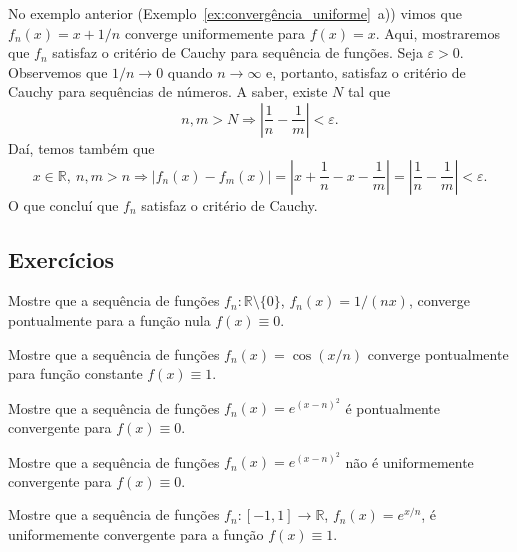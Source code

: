 \begin{ex}
  No exemplo anterior (Exemplo~\ref{ex:convergência_uniforme}~a)) vimos que $f_n(x) = x + 1/n$ converge uniformemente para $f(x) = x$. Aqui, mostraremos que $f_n$ satisfaz o critério de Cauchy para sequência de funções.
  Seja $\varepsilon>0$. Observemos que $1/n\to 0$ quando $n\to \infty$ e, portanto, satisfaz o critério de Cauchy para sequências de números. A saber, existe $N$ tal que
  \begin{equation}
    n,m > N \Rightarrow \left|\frac{1}{n} - \frac{1}{m}\right| < \varepsilon.
  \end{equation}
  Daí, temos também que
  \begin{equation}
    x\in\mathbb{R}, ~n,m>n \Rightarrow |f_n(x) - f_m(x)| = \left|x+\frac{1}{n} - x - \frac{1}{m}\right| = \left|\frac{1}{n} - \frac{1}{m}\right| < \varepsilon.
  \end{equation}
O que concluí que $f_n$ satisfaz o critério de Cauchy.
\end{ex}

\subsection*{Exercícios}

\begin{exer}
  Mostre que a sequência de funções $f_n:\mathbb{R}\setminus \{0\}$, $f_n(x) = 1/(nx)$, converge pontualmente para a função nula $f(x) \equiv 0$.
\end{exer}

\begin{exer}
  Mostre que a sequência de funções $f_n(x) = \cos(x/n)$ converge pontualmente para função constante $f(x)\equiv 1$.
\end{exer}

\begin{exer}
  Mostre que a sequência de funções $f_n(x) = e^{(x-n)^2}$ é pontualmente convergente para $f(x)\equiv 0$.
\end{exer}

\begin{exer}
  Mostre que a sequência de funções $f_n(x) = e^{(x-n)^2}$ não é uniformemente convergente para $f(x)\equiv 0$.
\end{exer}

\begin{exer}
  Mostre que a sequência de funções $f_n:[-1, 1]\to\mathbb{R}$, $f_n(x) = e^{x/n}$, é uniformemente convergente para a função $f(x)\equiv 1$.
\end{exer}

